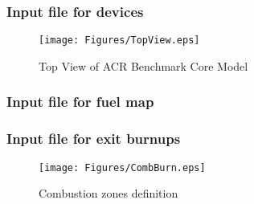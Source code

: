 
\goodbreak
\subsubsection{Input file for devices}

\begin{figure}[h!]
  \begin{center}
    \texttt{[image: Figures/TopView.eps]} 
\caption{Top View of ACR Benchmark Core Model}\label{fig:top}
  \end{center}
\end{figure}


\goodbreak
\subsubsection{Input file for fuel map}

\goodbreak
\subsubsection{Input file for exit burnups}
\vskip 0.5cm
\begin{figure}[h!]
  \begin{center}
    \texttt{[image: Figures/CombBurn.eps]} 
\caption{Combustion zones definition}\label{fig:comb}
  \end{center}
\end{figure}

\clearpage
